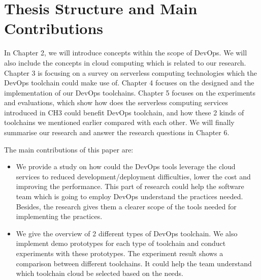 \section{Thesis Structure and Main Contributions}
In Chapter 2, we will introduce concepts within the scope of DevOps. We will also include the concepts in cloud computing which is related to our research. Chapter 3 is focusing on a survey on serverless computing technologies which the DevOps toolchain could make use of. Chapter 4 focuses on the designed and the implementation of our DevOps toolchains. Chapter 5 focuses on the experiments and evaluations, which show how does the serverless computing services introduced in CH3 could benefit DevOps toolchain, and how these 2 kinds of toolchains we mentioned earlier compared with each other. We will finally summarise our research and answer the research questions in Chapter 6.
\par
The main contributions of this paper are:
\begin{itemize}
    \item We provide a study on how could the DevOps tools leverage the cloud services to reduced development/deployment difficulties, lower the cost and improving the performance. This part of research could help the software team which is going to employ DevOps understand the practices needed. Besides, the research gives them a clearer scope of the tools needed for implementing the practices.
    \item We give the overview of 2 different types of DevOps toolchain. We also implement demo prototypes for each type of toolchain and conduct experiments with these prototypes. The experiment result shows a comparison between different toolchains. It could help the team understand which toolchain cloud be selected based on the needs.
\end{itemize}